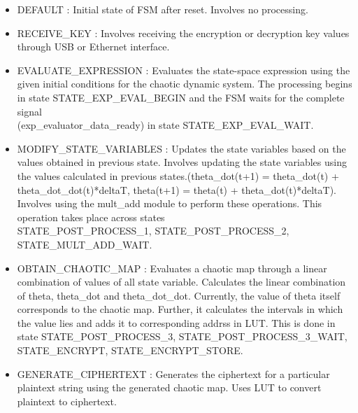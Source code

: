 
\begin{itemize}
\item DEFAULT : Initial state of FSM after reset. Involves no processing.
\item RECEIVE\_KEY : Involves receiving the encryption or decryption key values through USB or Ethernet interface.
\item EVALUATE\_EXPRESSION : Evaluates the state-space expression using the given initial conditions for the chaotic dynamic system. The processing begins in state STATE\_EXP\_EVAL\_BEGIN and the FSM waits for the complete signal \\(exp\_evaluator\_data\_ready) in state STATE\_EXP\_EVAL\_WAIT.
\item MODIFY\_STATE\_VARIABLES : Updates the state variables based on the values obtained in previous state. Involves updating the state variables using the values calculated in previous states.(theta\_dot(t+1) = theta\_dot(t) + theta\_dot\_dot(t)*deltaT, theta(t+1) = theta(t) + theta\_dot(t)*deltaT). Involves using the mult\_add module to perform these operations. This operation takes place across states \\ STATE\_POST\_PROCESS\_1, STATE\_POST\_PROCESS\_2, STATE\_MULT\_ADD\_WAIT.
\item OBTAIN\_CHAOTIC\_MAP : Evaluates a chaotic map through a linear combination of values of all state variable. Calculates the linear combination of theta, theta\_dot and theta\_dot\_dot. Currently, the value of theta itself corresponds to the chaotic map. Further, it calculates the intervals in which the value lies and adds it to corresponding addrss in LUT. This is done in state STATE\_POST\_PROCESS\_3, STATE\_POST\_PROCESS\_3\_WAIT, STATE\_ENCRYPT, STATE\_ENCRYPT\_STORE.
\item GENERATE\_CIPHERTEXT : Generates the ciphertext for a particular plaintext string using the generated chaotic map. Uses LUT to convert plaintext to ciphertext.
\end{itemize}

